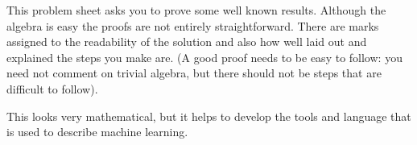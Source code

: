 \documentclass{sotonExamBoxes}    %
\begin{document}


\maketitle

This problem sheet asks you to prove some well known results.
Although the algebra is easy the proofs are not entirely
straightforward.  There are marks assigned to the readability of the
solution and also how well laid out and explained the steps you make
are. (A good proof needs to be easy to follow: you need not comment on
trivial algebra, but there should not be steps that are difficult to
follow).

This looks very mathematical, but it helps to develop the tools and
language that is used to describe machine learning.




\end{document}
